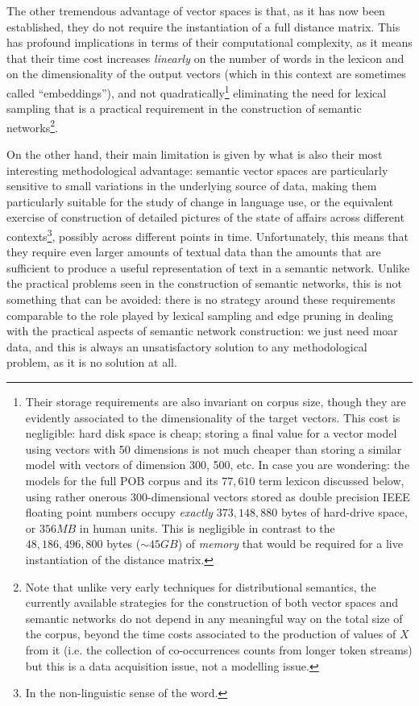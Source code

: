 The other tremendous advantage of vector spaces is that, as it has now been established, they do not require the instantiation of a full distance matrix.
This has profound implications in terms of their computational complexity, as it means that their time cost increases \emph{linearly} on the number of words in the lexicon and on the dimensionality of the output vectors (which in this context are sometimes called ``embeddings''), and not quadratically\footnote{
    Their storage requirements are also invariant on corpus size, though they are evidently associated to the dimensionality of the target vectors.
    This cost is negligible: hard disk space is cheap; storing a final value for a vector model using vectors with 50 dimensions is not much cheaper than storing a similar model with vectors of dimension 300, 500, etc.
    In case you are wondering: the models for the full POB corpus and its $77,610$ term lexicon discussed below, using rather onerous $300$-dimensional vectors stored as double precision IEEE floating point numbers occupy \emph{exactly} $373,148,880$ bytes of hard-drive space, or $356MB$ in human units.
    This is negligible in contrast to the $48,186,496,800$ bytes ($\sim45GB$) of \emph{memory} that would be required for a live instantiation of the distance matrix.
} eliminating the need for lexical sampling that is a practical requirement in the construction of semantic networks\footnote{
    Note that unlike very early techniques for distributional semantics, the currently available strategies for the construction of both vector spaces and semantic networks do not depend in any meaningful way on the total size of the corpus, beyond the time costs associated to the production of values of $X$ from it (i.e. the collection of co-occurrences counts from longer token streams) but this is a data acquisition issue, not a modelling issue.
}.

On the other hand, their main limitation is given by what is also their most interesting methodological advantage: semantic vector spaces are particularly sensitive to small variations in the underlying source of data, making them particularly suitable for the study of change in language use, or the equivalent exercise of construction of detailed pictures of the state of affairs across different contexts\footnote{
    In the non-linguistic sense of the word.
}, possibly across different points in time.
Unfortunately, this means that they require even larger amounts of textual data than the amounts that are sufficient to produce a useful representation of text in a semantic network.
Unlike the practical problems seen in the construction of semantic networks, this is not something that can be avoided: there is no strategy around these requirements comparable to the role played by lexical sampling and edge pruning in dealing with the practical aspects of semantic network construction: we just need moar data, and this is always an unsatisfactory solution to any methodological problem, as it is no solution at all.

